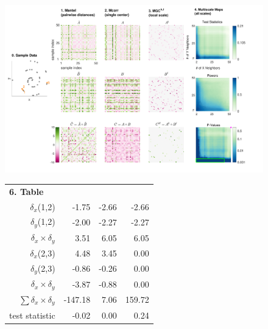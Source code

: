 \documentclass[11pt]{article}
\begin{document}
\begin{figure}[htbp]
\vspace{-50pt}
\includegraphics[width=1.0\textwidth,trim={0 0 1cm 0},clip]{Figures/FigA}
\setlength{\tabcolsep}{10pt} %
\begin{tabular}{r r r r}
\multicolumn{1}{l}{{\footnotesize \textbf{6. Table}}} & & & \\
$\delta_x$(1,2)   & \hspace{1.5em} \color{magenta}-1.75  & \hspace{3.5em} \color{magenta}-2.66  &  \hspace{3.0em} \color{magenta}-2.66  \\ 
 $\delta_y$(1,2) & \color{magenta}-2.00 & \color{magenta}-2.27 & \color{magenta}-2.27  \\ 
 $\delta_x \times \delta_y$ & \color{green}3.51 & \color{green}6.05 & \color{green}6.05  \\ 
 
\hline

 $\delta_x$(2,3) & \color{green}4.48 & \color{green}3.45 & 0.00  \\ 
 $\delta_y$(2,3) &  \color{magenta}-0.86 & \color{magenta}-0.26 & 0.00  \\ 
 $\delta_x \times \delta_y$ & \color{magenta}-3.87 & \color{magenta}-0.88 & 0.00  \\ 

\hline
 $\sum{\delta_x \times \delta_y}$ & \color{magenta}-147.18   & \color{green}7.06 & \color{green}159.72  \\ 
 test statistic &  \color{magenta}-0.02  & 0.00 & \color{green}0.24  \\  
\end{tabular}


\end{figure}
\end{document}
